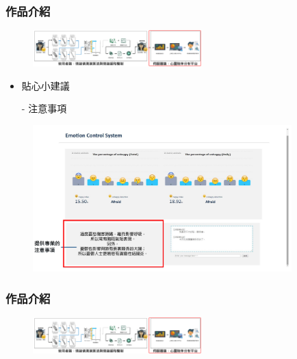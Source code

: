 \documentclass[10pt, conference, compsocconf]{beamer}
\begin{document}
\begin{CJK}{UTF8}{}
\begin{frame}
\end{frame}

\begin{frame}
\frametitle{作品介紹}

\vspace{-3mm}
\begin{figure}[t]
\begin{flushright}
\includegraphics[width=6.5cm]{./Figures/framework_version4_9.pdf}
\end{flushright}
\end{figure}

\vspace{-10mm}
\begin{itemize}
\item \Large 貼心小建議
\end{itemize}
\begin{itemize}
\item[-]  注意事項
\end{itemize}

\begin{figure}[!t]
\begin{center}
\includegraphics[width=10cm]{./Figures/web7.pdf}
\end{center}
\end{figure}

\end{frame}

\begin{frame}
\frametitle{作品介紹}
\vspace{-3mm}
\begin{figure}[t]
\begin{flushright}
\includegraphics[width=6.5cm]{./Figures/framework_version4_9.pdf}
\end{flushright}
\end{figure}


\end{frame}
\end{CJK}
\end{document}
